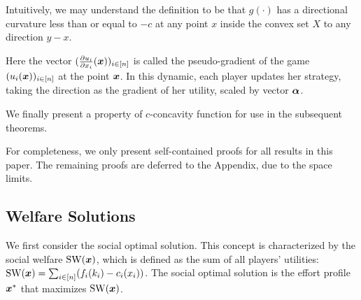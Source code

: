 Intuitively, we may understand the definition to be that $g(\cdot)$ has a directional curvature
less than or equal to $-c$ at any point $x$ inside the convex set $X$ to any direction $y - x$. 




Here the vector $(\frac{\partial u_i}{\partial x_i}({\bm{x}}))_{i\in[n]}$ is called the pseudo-gradient of the game $(u_i({\bm{x}}))_{i\in[n]}$ at the point ${\bm{x}}$. 
In this dynamic, each player updates her strategy, taking the direction as the gradient of her utility, scaled by vector $\bm{\alpha}$.

 
We finally present a property of $c$-concavity function for use in the subsequent theorems.



For completeness, we only present self-contained proofs for all results in this paper. The remaining proofs are deferred to the Appendix, due to the space limits.

\subsection{Welfare Solutions}
\label{subsec:welfare}
We first consider the social optimal solution. This concept is characterized by the social welfare $\mathrm{SW}({\bm{x}})$, which is defined as the sum of all players' utilities: $\mathrm{SW}({\bm{x}}) = \sum_{i\in[n]} (f_i(k_i) - c_i(x_i))$. The social optimal solution is the effort profile ${\bm{x}}^*$ that maximizes $\mathrm{SW}({\bm{x}})$.

